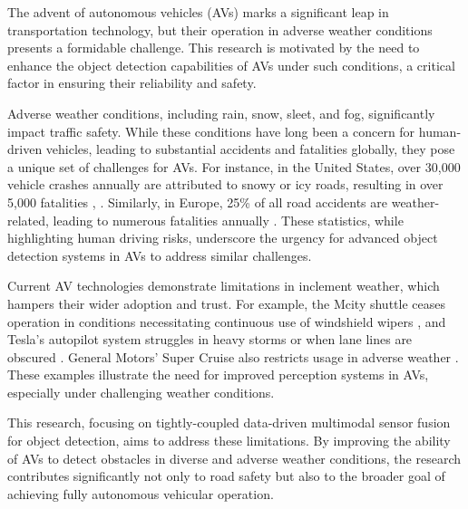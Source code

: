 \documentclass[report.tex]{subfiles}
\begin{document}

        The advent of autonomous vehicles (AVs) marks a significant leap in transportation technology, but their operation in adverse weather conditions presents a formidable challenge. This research is motivated by the need to enhance the object detection capabilities of AVs under such conditions, a critical factor in ensuring their reliability and safety.

        Adverse weather conditions, including rain, snow, sleet, and fog, significantly impact traffic safety. While these conditions have long been a concern for human-driven vehicles, leading to substantial accidents and fatalities globally, they pose a unique set of challenges for AVs. For instance, in the United States, over 30,000 vehicle crashes annually are attributed to snowy or icy roads, resulting in over 5,000 fatalities \cite{federal-highway-administration-no-date}, \cite{usDepartmentofCommerce2016}. Similarly, in Europe, 25\% of all road accidents are weather-related, leading to numerous fatalities annually \cite{cookson-2022}. These statistics, while highlighting human driving risks, underscore the urgency for advanced object detection systems in AVs to address similar challenges.

        Current AV technologies demonstrate limitations in inclement weather, which hampers their wider adoption and trust. For example, the Mcity shuttle ceases operation in conditions necessitating continuous use of windshield wipers \cite{briefs2015mcity}, and Tesla's autopilot system struggles in heavy storms or when lane lines are obscured \cite{Lambert2019}. General Motors' Super Cruise also restricts usage in adverse weather \cite{cadillac2021supercruise}. These examples illustrate the need for improved perception systems in AVs, especially under challenging weather conditions.

        This research, focusing on tightly-coupled data-driven multimodal sensor fusion for object detection, aims to address these limitations. By improving the ability of AVs to detect obstacles in diverse and adverse weather conditions, the research contributes significantly not only to road safety but also to the broader goal of achieving fully autonomous vehicular operation.
\end{document}
